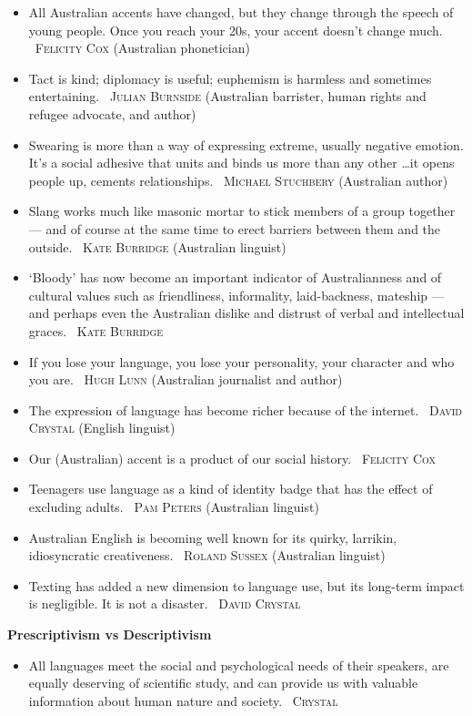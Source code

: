 \documentclass[10pt, a4paper]{article}
\newcommand{\heading}[1]{\textbf{#1}}
\newcommand{\linguist}[1]{\textemdash~\textsc{#1}}
\begin{document}
\begin{multicols}{2}
\begin{itemize}
    \item All Australian accents have changed, but they change through the speech of young people. Once you reach your 20s, your accent doesn't change much. \linguist{Felicity Cox} (Australian phonetician)
    \item Tact is kind; diplomacy is useful; euphemism is harmless and sometimes entertaining. \linguist{Julian Burnside} (Australian barrister, human rights and refugee advocate, and author)
    \item Swearing is more than a way of expressing extreme, usually negative emotion. It's a social adhesive that units and binds us more than any other \dots it opens people up, cements relationships. \linguist{Michael Stuchbery} (Australian author)
    \item Slang works much like masonic mortar to stick members of a group together --- and of course at the same time to erect barriers between them and the outside. \linguist{Kate Burridge} (Australian linguist)
    \item `Bloody' has now become an important indicator of Australianness and of cultural values such as friendliness, informality, laid-backness, mateship --- and perhaps even the Australian dislike and distrust of verbal and intellectual graces. \linguist{Kate Burridge}
    \item If you lose your language, you lose your personality, your character and who you are. \linguist{Hugh Lunn} (Australian journalist and author)
    \item The expression of language has become richer because of the internet. \linguist{David Crystal} (English linguist)
    \item Our (Australian) accent is a product of our social history. \linguist{Felicity Cox}
    \item Teenagers use language as a kind of identity badge that has the effect of excluding adults. \linguist{Pam Peters} (Australian linguist)
    \item Australian English is becoming well known for its quirky, larrikin, idiosyncratic creativeness. \linguist{Roland Sussex} (Australian linguist)
    \item Texting has added a new dimension to language use, but its long-term impact is negligible. It is not a disaster. \linguist{David Crystal}
  \end{itemize}
  \heading{Prescriptivism vs Descriptivism}
  \begin{itemize}
    \item All languages meet the social and psychological needs of their speakers, are equally deserving of scientific study, and can provide us with valuable information about human nature and society. \linguist{Crystal}

\end{itemize}
\end{multicols}
\end{document}
